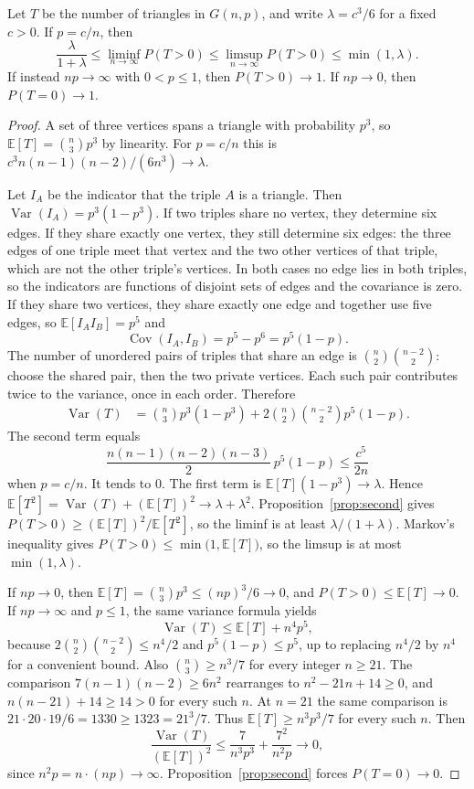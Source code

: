 \begin{theorem}[triangles]\label{thm:triangles}
Let $T$ be the number of triangles in $G(n,p)$, and write $\lambda=c^3/6$ for a fixed $c>0$. If $p=c/n$, then
\[
 \frac{\lambda}{1+\lambda}
 \le\liminf_{n\to\infty}P(T>0)
 \le\limsup_{n\to\infty}P(T>0)
 \le\min(1,\lambda).
\]
If instead $np\to\infty$ with $0<p\le1$, then $P(T>0)\to1$. If $np\to0$, then $P(T=0)\to1$.
\end{theorem}
\begin{proof}
A set of three vertices spans a triangle with probability $p^3$, so $\mathbb E[T]=\binom{n}{3}p^3$ by linearity. For $p=c/n$ this is $c^3 n(n-1)(n-2)/(6n^3)\to\lambda$.

Let $I_A$ be the indicator that the triple $A$ is a triangle. Then $\operatorname{Var}(I_A)=p^3(1-p^3)$. If two triples share no vertex, they determine six edges. If they share exactly one vertex, they still determine six edges: the three edges of one triple meet that vertex and the two other vertices of that triple, which are not the other triple's vertices. In both cases no edge lies in both triples, so the indicators are functions of disjoint sets of edges and the covariance is zero. If they share two vertices, they share exactly one edge and together use five edges, so $\mathbb E[I_AI_B]=p^5$ and
\[
 \operatorname{Cov}(I_A,I_B)=p^5-p^6=p^5(1-p).
\]
The number of unordered pairs of triples that share an edge is $\binom{n}{2}\binom{n-2}{2}$: choose the shared pair, then the two private vertices. Each such pair contributes twice to the variance, once in each order. Therefore
\begin{align*}
 \operatorname{Var}(T)
 &=\binom{n}{3}p^3(1-p^3)
 +2\binom{n}{2}\binom{n-2}{2}p^5(1-p).
\end{align*}
The second term equals
\[
 \frac{n(n-1)(n-2)(n-3)}{2}\,p^5(1-p)
 \le\frac{c^5}{2n}
\]
when $p=c/n$. It tends to $0$. The first term is $\mathbb E[T](1-p^3)\to\lambda$. Hence $\mathbb E[T^2]=\operatorname{Var}(T)+(\mathbb E[T])^2\to\lambda+\lambda^2$. Proposition~\ref{prop:second} gives $P(T>0)\ge(\mathbb E[T])^2/\mathbb E[T^2]$, so the liminf is at least $\lambda/(1+\lambda)$. Markov's inequality gives $P(T>0)\le\min\bigl(1,\mathbb E[T]\bigr)$, so the limsup is at most $\min(1,\lambda)$.

If $np\to0$, then $\mathbb E[T]=\binom{n}{3}p^3\le(np)^3/6\to0$, and $P(T>0)\le\mathbb E[T]\to0$. If $np\to\infty$ and $p\le1$, the same variance formula yields
\[
 \operatorname{Var}(T)\le\mathbb E[T]+n^4 p^5,
\]
because $2\binom{n}{2}\binom{n-2}{2}\le n^4/2$ and $p^5(1-p)\le p^5$, up to replacing $n^4/2$ by $n^4$ for a convenient bound. Also $\binom{n}{3}\ge n^3/7$ for every integer $n\ge21$. The comparison $7(n-1)(n-2)\ge6n^2$ rearranges to $n^2-21n+14\ge0$, and $n(n-21)+14\ge14>0$ for every such $n$. At $n=21$ the same comparison is $21\cdot20\cdot19/6=1330\ge1323=21^3/7$. Thus $\mathbb E[T]\ge n^3 p^3/7$ for every such $n$. Then
\[
 \frac{\operatorname{Var}(T)}{(\mathbb E[T])^2}
 \le\frac{7}{n^3 p^3}+\frac{7^2}{n^2 p}\to0,
\]
since $n^2 p=n\cdot(np)\to\infty$. Proposition~\ref{prop:second} forces $P(T=0)\to0$.
\end{proof}

